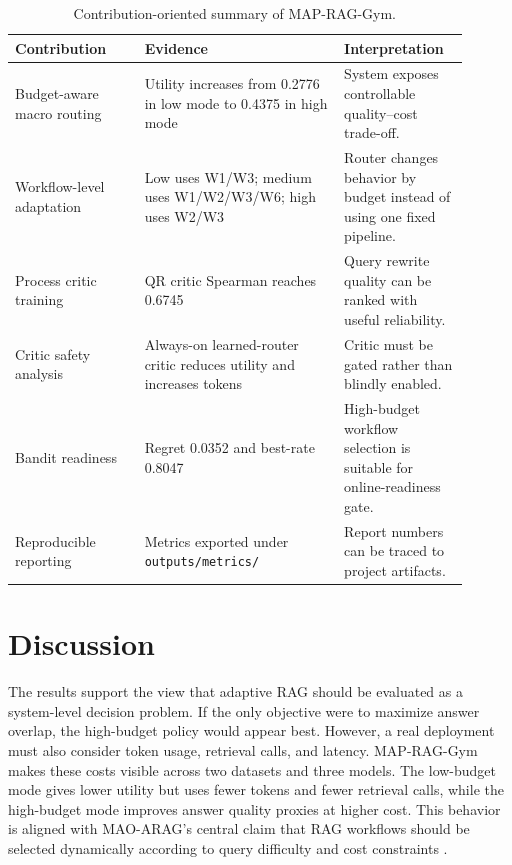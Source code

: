 \documentclass[12pt,a4paper]{article}
\begin{document}
\begin{table}[H]
\centering
\caption{Contribution-oriented summary of MAP-RAG-Gym.}
\label{tab:contribution_summary}
\begin{tabular}{p{0.26\linewidth}p{0.40\linewidth}p{0.24\linewidth}}
\toprule
\textbf{Contribution} & \textbf{Evidence} & \textbf{Interpretation} \\
\midrule
Budget-aware macro routing & Utility increases from 0.2776 in low mode to 0.4375 in high mode & System exposes controllable quality--cost trade-off. \\
Workflow-level adaptation & Low uses W1/W3; medium uses W1/W2/W3/W6; high uses W2/W3 & Router changes behavior by budget instead of using one fixed pipeline. \\
Process critic training & QR critic Spearman reaches 0.6745 & Query rewrite quality can be ranked with useful reliability. \\
Critic safety analysis & Always-on learned-router critic reduces utility and increases tokens & Critic must be gated rather than blindly enabled. \\
Bandit readiness & Regret 0.0352 and best-rate 0.8047 & High-budget workflow selection is suitable for online-readiness gate. \\
Reproducible reporting & Metrics exported under \texttt{outputs/metrics/} & Report numbers can be traced to project artifacts. \\
\bottomrule
\end{tabular}
\end{table}

\section{Discussion}

The results support the view that adaptive RAG should be evaluated as a system-level decision problem. If the only objective were to maximize answer overlap, the high-budget policy would appear best. However, a real deployment must also consider token usage, retrieval calls, and latency. MAP-RAG-Gym makes these costs visible across two datasets and three models. The low-budget mode gives lower utility but uses fewer tokens and fewer retrieval calls, while the high-budget mode improves answer quality proxies at higher cost. This behavior is aligned with MAO-ARAG's central claim that RAG workflows should be selected dynamically according to query difficulty and cost constraints \cite{chen2025maoarag}.
\end{document}
